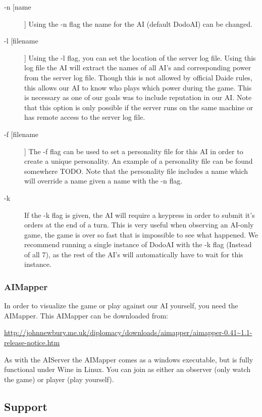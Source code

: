 \documentclass[a4paper]{article} %
\begin{document}
\begin{description}
\item[-n [name]] Using the -n flag the name for the AI (default DodoAI) can be changed. 
\item[-l [filename]] Using the -l flag, you can set the location of the server log file. Using this log file the AI will extract the names of all AI's and corresponding power from the server log file. Though this is not allowed by official Daide rules, this allows our AI to know who plays which power during the game. This is necessary as one of our goals was to include reputation in our AI. Note that this option is only possible if the server runs on the same machine or has remote access to the server log file.  
\item[-f [filename]] The -f flag can be used to set a personality file for this AI in order to create a unique personality. An example of a personality file can be found somewhere TODO. Note that the personality file includes a name which will override a name given a name with the -n flag.  %
\item[-k] If the -k flag is given, the AI will require a keypress in order to submit it's orders at the end of a turn. This is very useful when observing an AI-only game, the game is over so fast that is impossible to see what happened. We recommend running a single instance of DodoAI with the -k flag (Instead of all 7), as the rest of the AI's will automatically have to wait for this instance.  
\end{description} 

\subsubsection{AIMapper}
In order to visualize the game or play against our AI yourself, you need the AIMapper. This AIMapper can be downloaded from: 

\noindent\url{http://johnnewbury.me.uk/diplomacy/downloads/aimapper/aimapper-0.41~1.1-release-notice.htm}

As with the AIServer the AIMapper comes as a windows executable, but is fully functional under Wine in Linux. You can join as either an observer (only watch the game) or player (play yourself). 


\subsection{Support}
\end{document}
